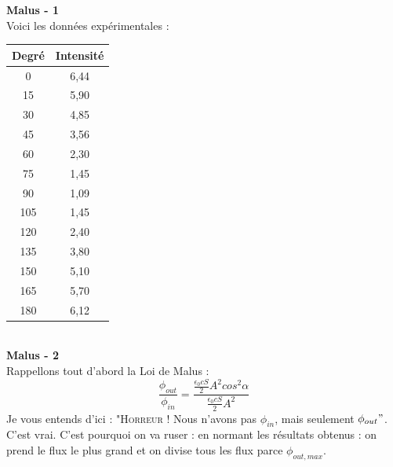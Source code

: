 \documentclass	[11pt, a4paper, openany]{book}
\begin{document}
		\textbf{Malus - 1}\\
		Voici les données expérimentales : 
		\begin{center}
			\begin{tabular}{|c|c|}
				\hline 
				Degré & Intensité \\ 
				\hline 
				0      & 6,44       \\ 
				\hline 
				15     & 5,90       \\ 
				\hline 
				30     & 4,85       \\ 
				\hline 
				45     & 3,56       \\ 
				\hline 
				60     & 2,30       \\ 
				\hline 
				75     & 1,45       \\ 
				\hline 
				90     & 1,09       \\ 
				\hline 
				105    & 1,45       \\ 
				\hline 
				120    & 2,40       \\ 
				\hline 
				135    & 3,80       \\ 
				\hline 
				150    & 5,10       \\ 
				\hline 
				165    & 5,70       \\ 
				\hline 
				180    & 6,12       \\ 
				\hline 
			\end{tabular} 
		\end{center}
		\ \\
		\textbf{Malus - 2}\\
		Rappellons tout d'abord la Loi de Malus :
		\begin{equation}
			\frac{\phi_{out}}{\phi_{in}} = \frac{\frac{\epsilon_0 cS}{2}A^2cos^2\alpha}{\frac{\epsilon_0 c S}{2}A^2}
		\end{equation}
		Je vous entends d'ici : "\textsc{Horreur !} Nous n'avons pas $\phi_{in}$, mais seulement $\phi_{out}"$. C'est vrai. C'est pourquoi on va ruser : en normant les résultats obtenus : on prend le flux le plus grand et on divise tous les flux parce $\phi_{out, max}$.\\
		
\end{document}
